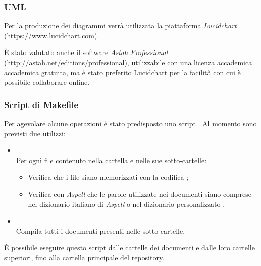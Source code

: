 		
		\subsubsection{UML}
		
		Per la produzione dei diagrammi \emph{} verrà utilizzata la piattaforma \emph{Lucidchart} (\url{https://www.lucidchart.com}).
		
		È stato valutato anche il software \emph{Astah Professional} (\url{http://astah.net/editions/professional}), utilizzabile con una licenza accademica accademica gratuita, ma è stato preferito Lucidchart per la facilità con cui è possibile collaborare online.
		

		\subsubsection{Script di Makefile}
		\label{makefile}

Per agevolare alcune operazioni è stato predisposto uno script . Al momento sono previsti due utilizzi:
\begin{itemize}
 \item \textbf{} \\
	Per ogni file  contenuto nella cartella e nelle sue sotto-cartelle:
	\begin{itemize}
		\item Verifica che i file siano memorizzati con la codifica ;
		\item Verifica con \emph{Aspell} che le parole utilizzate nei documenti siano comprese nel dizionario italiano di \emph{Aspell} o nel dizionario personalizzato .
	\end{itemize}
 \item \textbf{} \\
	Compila tutti i documenti presenti nelle sotto-cartelle.

\end{itemize}

È possibile eseguire questo script dalle cartelle dei documenti e dalle loro cartelle superiori, fino alla cartella principale del repository.

